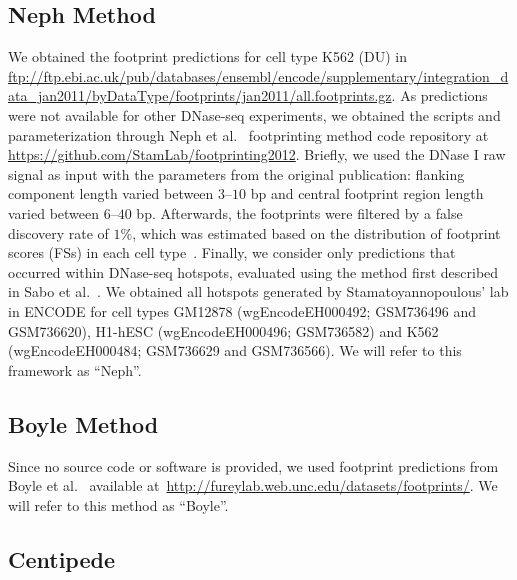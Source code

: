 \subsection{Neph Method}
\label{sec:neph}

We obtained the footprint predictions for cell type K562 (DU) in \url{ftp://ftp.ebi.ac.uk/pub/databases/ensembl/encode/supplementary/integration_data_jan2011/byDataType/footprints/jan2011/all.footprints.gz}. As predictions were not available for other DNase-seq experiments, we obtained the scripts and parameterization through Neph et al.~\cite{neph2012a} footprinting method code repository at \url{https://github.com/StamLab/footprinting2012}. Briefly, we used the DNase I raw signal as input with the parameters from the original publication: flanking component length varied between $3$--$10$ bp and central footprint region length varied between $6$--$40$ bp. Afterwards, the footprints were filtered by a false discovery rate of $1\%$, which was estimated based on the distribution of footprint scores (FSs) in each cell type~\cite{neph2012a}. Finally, we consider only predictions that occurred within DNase-seq hotspots, evaluated using the method first described in Sabo et al.~\cite{sabo2004b}. We obtained all hotspots generated by Stamatoyannopoulous' lab in ENCODE for cell types GM12878 (wgEncodeEH000492; GSM736496 and GSM736620), H1-hESC (wgEncodeEH000496; GSM736582) and K562 (wgEncodeEH000484; GSM736629 and GSM736566). We will refer to this framework as ``Neph''.

\subsection{Boyle Method}
\label{sec:boyle}

Since no source code or software is provided, we used footprint predictions from Boyle et al.~\cite{boyle2011} available at~\url{http://fureylab.web.unc.edu/datasets/footprints/}. We will refer to this method as ``Boyle''.

\subsection{Centipede}
\label{sec:centipede}

